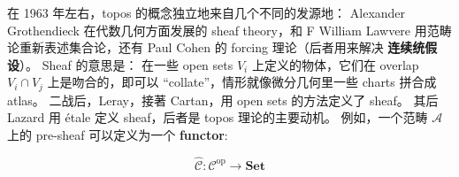 \documentclass[12pt, orivec]{article}
\newcommand{\cc}[2]{#1}
\newcommand{\cc}[2]{#2}
\begin{document}
\cc{在 1963 年左右，topos 的概念独立地来自几个不同的发源地： Alexander Grothendieck 在代数几何方面发展的 sheaf theory，和 F William Lawvere 用范畴论重新表述集合论，还有 Paul Cohen 的 forcing 理论（后者用来解决 \textbf{连续统假设}）。  Sheaf 的意思是： 在一些 open sets $V_i$ 上定义的物体，它们在 overlap $V_i \cap V_j$ 上是吻合的，即可以 ``collate''，情形就像微分几何里一些 charts 拼合成 atlas。  二战后，Leray，接著 Cartan，用 open sets 的方法定义了 sheaf。 其后 Lazard 用 \'{e}tale 定义 sheaf，后者是 topos 理论的主要动机。  例如，一个范畴 $\mathscr{A}$ 上的 pre-sheaf 可以定义为一个 \textbf{functor}:
}{
Around 1963, the concept of topos came independently from several different sources:

\begin{itemize}
\item Alexander Grothendieck's sheaf theory in algebraic geometry

\item F William Lawvere's categorical re-formulation of set theory

\item Paul Cohen's invention of forcing (to resolve the \textbf{Continuum Hypothesis})
\end{itemize} 

A useful aspect of topos theory is that it allows for a great variety of different \textbf{models} in contrast to ZFC for which it is fairly hard to construct different models.  Thus topos theory helped Cohen to construct forcing models for ZFC where the Continuum Hypothesis fails.

Sheaf means: Objects defined on some open sets $V_i$, they are consistent on the overlap $V_i \cap V_j$, which can be ``collate''. The situation is like some charts in differential geometry. . After World War II, Leray, then Cartan, defined sheaf using the open sets method. Later Lazard defined sheaf with \'{e}tale, which is the main motivation for the topos theory. For example, a pre-sheaf on a category $\mathscr{C}$ can be defined as a \textbf{functor}:}
\begin{equation}
\widehat{\mathscr{C}}: \mathscr{C}^{\mathrm{op}} \rightarrow \mathbf{Set}
\end{equation}
\end{document}
